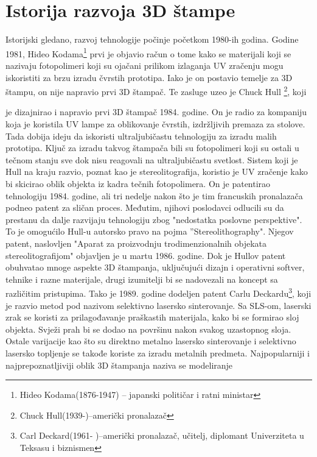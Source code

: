 \documentclass[a4paper]{article}
\begin{document}
\section{Istorija razvoja 3D štampe \cite{c}}

\bigbreak Istorijski gledano, razvoj tehnologije počinje početkom 1980-ih godina. Godine
1981, Hideo Kodama\footnote{Hideo Kodama(1876-1947) – japanski političar i ratni
ministar} prvi je objavio račun o tome kako se materijali koji se nazivaju fotopolimeri
koji su ojačani prilikom izlaganja UV zračenju mogu iskoristiti za brzu izradu čvrstih
prototipa. Iako je on postavio temelje za 3D štampu, on nije napravio prvi 3D štampač.
Te zasluge uzeo je Chuck Hull \footnote{Chuck Hull(1939-)–američki pronalazač}, koji

je dizajnirao i napravio prvi 3D štampač 1984. godine. On je radio za kompaniju koja je
koristila UV lampe za oblikovanje čvrstih, izdržljivih premaza za stolove. Tada dobija
ideju da iskoristi ultraljubičastu tehnologiju za izradu malih prototipa.
\bigbreak Ključ za izradu takvog štampača bili su fotopolimeri koji su ostali u tečnom
stanju sve dok nisu reagovali na ultraljubičastu svetlost. Sistem koji je Hull na kraju
razvio, poznat kao je stereolitografija, koristio je UV zračenje kako bi skicirao oblik
objekta iz kadra tečnih fotopolimera.
\bigbreak On je patentirao tehnologiju 1984. godine, ali tri nedelje nakon što je tim
francuskih pronalazača podneo patent za sličan proces. Međutim, njihovi poslodavci
odlucili su da prestanu da dalje razvijaju tehnologiju zbog "nedostatka poslovne
perspektive". To je omogućilo Hull-u autorsko pravo na pojma ''Stereolithography".
Njegov patent, naslovljen "Aparat za proizvodnju trodimenzionalnih objekata
stereolitografijom" objavljen je u martu 1986. godine.
\bigbreak Dok je Hullov patent obuhvatao mnoge aspekte 3D štampanja, uključujući
dizajn i operativni softver, tehnike i razne materijale, drugi izumitelji bi se nadovezali na
koncept sa različitim pristupima. Tako je 1989. godine dodeljen patent Carlu
Deckardu\footnote{Carl Deckard(1961- )–američki pronalazač, učitelj, diplomant
Univerziteta u Teksasu i biznismen}, koji je razvio metod pod nazivom selektivno
lasersko sinterovanje. Sa SLS-om, laserski zrak se koristi za prilagođavanje praškastih
materijala, kako bi se formirao sloj objekta. Svježi prah bi se dodao na površinu nakon
svakog uzastopnog sloja. Ostale varijacije kao što su direktno metalno lasersko
sinterovanje i selektivno lasersko topljenje se takođe koriste za izradu metalnih predmeta.
\bigbreak Najpopularniji i najprepoznatljiviji oblik 3D štampanja naziva se modeliranje
\end{document}
